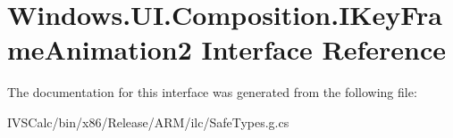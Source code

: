 \hypertarget{interface_windows_1_1_u_i_1_1_composition_1_1_i_key_frame_animation2}{}\section{Windows.\+U\+I.\+Composition.\+I\+Key\+Frame\+Animation2 Interface Reference}
\label{interface_windows_1_1_u_i_1_1_composition_1_1_i_key_frame_animation2}


The documentation for this interface was generated from the following file\+:\begin{DoxyCompactItemize}
\item 
I\+V\+S\+Calc/bin/x86/\+Release/\+A\+R\+M/ilc/Safe\+Types.\+g.\+cs\end{DoxyCompactItemize}
